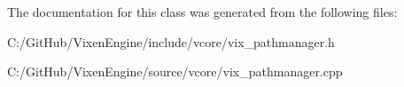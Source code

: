 The documentation for this class was generated from the following files\+:\begin{DoxyCompactItemize}
\item 
C\+:/\+Git\+Hub/\+Vixen\+Engine/include/vcore/vix\+\_\+pathmanager.\+h\item 
C\+:/\+Git\+Hub/\+Vixen\+Engine/source/vcore/vix\+\_\+pathmanager.\+cpp\end{DoxyCompactItemize}
